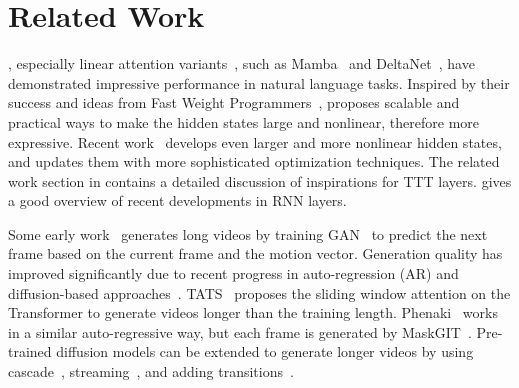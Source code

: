 \section{Related Work}
\label{sec:related}

, especially linear attention variants~\cite{schmidhuberlinearattn, katharopoulos2020lineartransformers}, such as Mamba~\cite{gu2024mamba, dao2024mamba2} and DeltaNet~\cite{schlag2021deltanet, yang2024parallelizing}, have demonstrated impressive performance in natural language tasks. 
Inspired by their success and ideas from Fast Weight Programmers~\cite{schmidhuber1992learning, kirsch2021meta, irie2021going, clark2022meta}, \cite{sun2024ttt} proposes scalable and practical ways to make the hidden states large and nonlinear, therefore more expressive.
Recent work~\cite{behrouz2024titans} develops even larger and more nonlinear hidden states, and updates them with more sophisticated optimization techniques.
The related work section in \cite{sun2024ttt} contains a detailed discussion of inspirations for TTT layers.
\cite{wang2025test} gives a good overview of recent developments in RNN layers.

Some early work~\cite{skorokhodov2022styleganv} generates long videos by training GAN~\cite{goodfellow2020gan,karras2020stylegan2} to predict the next frame based on the current frame and the motion vector.
Generation quality has improved significantly due to recent progress in auto-regression (AR) and diffusion-based approaches~\cite{gupta2024walt,meta2024moviegen,yang2024cogvideox,kong2025hunyuanvideo}.
TATS~\cite{ge2022tats} proposes the sliding window attention on the Transformer to generate videos longer than the training length.
Phenaki~\cite{villegas2023phenaki} works in a similar auto-regressive way, but each frame is generated by MaskGIT~\cite{chang2022maskgit}.
Pre-trained diffusion models can be extended to generate longer videos by using cascade~\cite{he2022lvdm,yin2023nuwa,wang2024lavie}, streaming~\cite{henschel2024streamingt2v}, and adding transitions~\cite{chen2023seine}.



